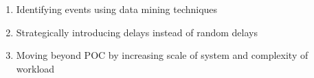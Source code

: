 \begin{enumerate}
\item Identifying events using data mining techniques
\item Strategically introducing delays instead of random delays
\item Moving beyond POC by increasing scale of system and complexity of workload
\end{enumerate}
